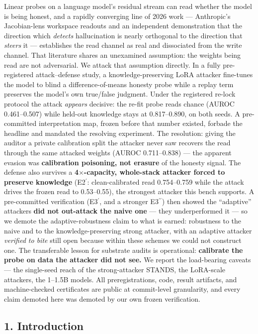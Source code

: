 \documentclass[
  11pt,
]{article}
\begin{document}
Linear probes on a language model's residual stream can read whether the
model is being honest, and a rapidly converging line of 2026 work ---
Anthropic's Jacobian-lens workspace readouts and an independent
demonstration that the direction which \emph{detects} hallucination is
nearly orthogonal to the direction that \emph{steers} it --- establishes
the read channel as real and dissociated from the write channel. That
literature shares an unexamined assumption: the weights being read are
not adversarial. We attack that assumption directly. In a fully
pre-registered attack--defense study, a knowledge-preserving LoRA
attacker fine-tunes the model to blind a difference-of-means honesty
probe while a replay term preserves the model's own true/false judgment.
Under the registered re-lock protocol the attack \emph{appears}
decisive: the re-fit probe reads chance (AUROC 0.461--0.507) while
held-out knowledge stays at 0.817--0.890, on both seeds. A pre-committed
interpretation map, frozen before that number existed, forbade the
headline and mandated the resolving experiment. The resolution: giving
the auditor a private calibration split the attacker never saw recovers
the read through the same attacked weights (AUROC 0.711--0.838) --- the
apparent evasion was \textbf{calibration poisoning, not erasure} of the
honesty signal. The defense also survives a \textbf{4$\times$-capacity,
whole-stack attacker forced to preserve knowledge} (E2$^\prime$:
clean-calibrated read 0.754--0.759 while the attack drives the frozen
read to 0.53--0.55), the strongest attacker this bench supports. A
pre-committed verification (E3$^\prime$, and a stronger E3$^{\prime\prime}$) then showed the
``adaptive'' attackers \textbf{did not out-attack the naive one} ---
they underperformed it --- so we demote the adaptive-robustness claim to
what is earned: robustness to the naive and to the knowledge-preserving
strong attacker, with an adaptive attacker \emph{verified to bite} still
open because within these schemes we could not construct one. The
transferable lesson for substrate audits is operational:
\textbf{calibrate the probe on data the attacker did not see.} We report
the load-bearing caveats --- the single-seed reach of the
strong-attacker STANDS, the LoRA-scale attackers, the 1--1.5B models.
All preregistrations, code, result artifacts, and machine-checked
certificates are public at commit-level granularity, and every claim
demoted here was demoted by our own frozen verification.

\subsection{1. Introduction}\label{introduction}
\end{document}
